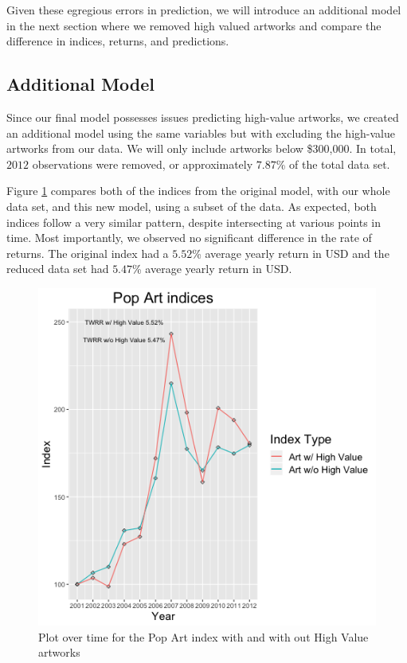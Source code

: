 \documentclass[]{asaproc}\usepackage[]{graphicx}\usepackage[]{color}
\begin{document}
Given these egregious errors in prediction, we will introduce an additional model in the next section where we removed high valued artworks and compare the difference in indices, returns, and predictions.

\subsection{Additional Model}

Since our final model possesses issues predicting high-value artworks, we created an additional model using the same variables but with excluding the high-value artworks from our data. We will only include artworks below \$300,000. In total, $2012$ observations were removed, or approximately $7.87$\%  of the total data set.

Figure \ref{index_red_plot} compares both of the indices from the original model, with our whole data set, and this new model, using a subset of the data. As expected, both indices follow a very similar pattern, despite intersecting at various points in time. Most importantly, we observed no significant difference in the rate of returns. The original index had a  $5.52$\% average yearly return in USD and the reduced data set had $5.47$\% average yearly return in USD.
 
\begin{figure}[!ht]

\includegraphics[scale = 0.5]{index_red}
\caption{Plot over time for the Pop Art index with and with out High Value artworks}
\label{index_red_plot}
\end{figure}
\end{document}
